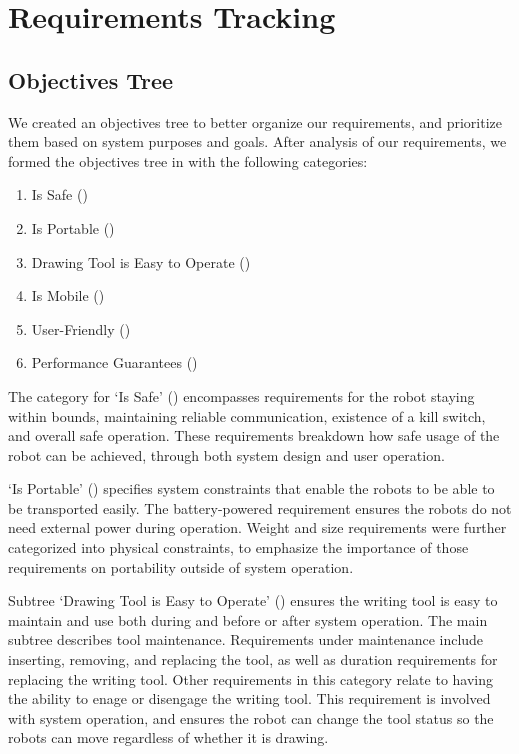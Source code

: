 \section{Requirements Tracking}
\label{sec:requirements_tracking}


\subsection{Objectives Tree}
\label{sec:objectives_tree}

We created an objectives tree to better organize our requirements, and prioritize them based on system purposes and goals. After analysis of our requirements, we
formed the objectives tree in  with the following categories:

\begin{enumerate}
\item Is Safe ()
\item Is Portable ()
\item Drawing Tool is Easy to Operate ()
\item Is Mobile ()
\item User-Friendly ()
\item Performance Guarantees ()
\end{enumerate}

The category for `Is Safe' () encompasses requirements for the robot staying within bounds, maintaining reliable communication, existence of a kill switch, and overall safe operation. These requirements breakdown how safe usage of the robot can be achieved, through both system design and user operation.

`Is Portable' () specifies system constraints that enable the robots to be able to be transported easily. The battery-powered requirement ensures the robots do not need external power during operation. Weight and size requirements were further categorized into physical constraints, to emphasize the importance of those requirements on portability outside of system operation.

Subtree `Drawing Tool is Easy to Operate' () ensures the writing tool is easy to maintain and use both during and before or after system operation. The main subtree describes tool maintenance. Requirements under maintenance include inserting, removing, and replacing the tool, as well as duration requirements for replacing the writing tool. Other requirements in this category relate to having the ability to enage or disengage the writing tool. This requirement is involved with system operation, and ensures the robot can change the tool status so the robots can move regardless of whether it is drawing.

